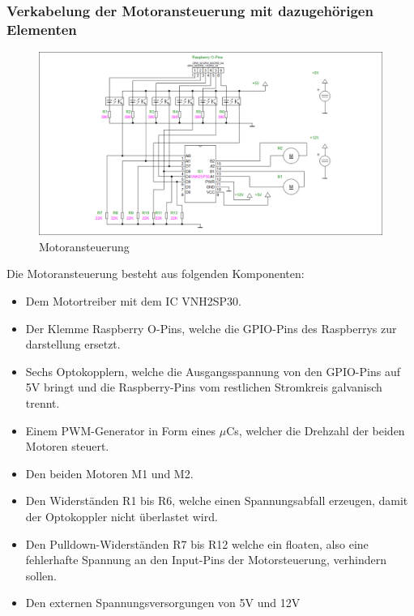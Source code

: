 \subsubsection{Verkabelung der Motoransteuerung mit dazugehörigen Elementen}
\begin{figure}[H] 

\begin{center}

\includegraphics[width=15cm]{Bilder/Schaltplan/Motoransteuerung}
\caption{Motoransteuerung}
\label{Motoransteuerung}
\end{center}
\end{figure}
Die Motoransteuerung besteht aus folgenden Komponenten:\\
\begin{itemize}
\item Dem Motortreiber mit dem IC VNH2SP30.
\item Der Klemme Raspberry O-Pins, welche die GPIO-Pins des Raspberrys zur darstellung ersetzt.
\item Sechs Optokopplern, welche die Ausgangsspannung von den GPIO-Pins auf 5V bringt und die Raspberry-Pins vom restlichen Stromkreis galvanisch trennt.
\item Einem PWM-Generator in Form eines $\mu$Cs, welcher die Drehzahl der beiden Motoren steuert.
\item Den beiden Motoren M1 und M2.
\item Den Widerständen R1 bis R6, welche einen Spannungsabfall erzeugen, damit der Optokoppler nicht überlastet wird.
\item Den Pulldown-Widerständen R7 bis R12 welche ein floaten, also eine fehlerhafte Spannung an den Input-Pins der Motorsteuerung, verhindern sollen.
\item Den externen Spannungsversorgungen von 5V und 12V\\
\end{itemize}
